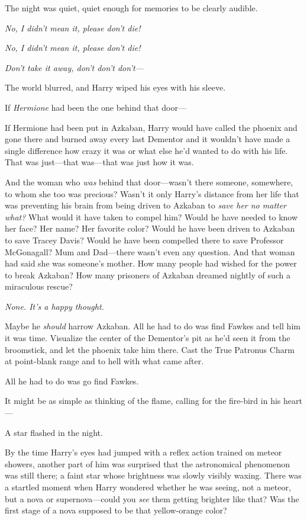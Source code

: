 The night was quiet, quiet enough for memories to be clearly audible.

\emph{No, I didn't mean it, please don't die!}

\emph{No, I didn't mean it, please don't die!}

\emph{Don't take it away, don't don't don't---}

The world blurred, and Harry wiped his eyes with his sleeve.

If \emph{Hermione} had been the one behind that door---

If Hermione had been put in Azkaban, Harry would have called the phoenix and
gone there and burned away every last Dementor and it wouldn't have made a
single difference how crazy it was or what else he'd wanted to do with his
life. That was just---that was---that was just how it was.

And the woman who \emph{was} behind that door---wasn't there someone,
somewhere, to whom she too was precious? Wasn't it only Harry's distance from
her life that was preventing his brain from being driven to Azkaban to
\emph{save her no matter what?} What would it have taken to compel him? Would
he have needed to know her face? Her name? Her favorite color? Would he have
been driven to Azkaban to save Tracey Davis? Would he have been compelled there
to save Professor McGonagall? Mum and Dad---there wasn't even any question. And
that woman had said she was someone's mother. How many people had wished for
the power to break Azkaban? How many prisoners of Azkaban dreamed nightly of
such a miraculous rescue?

\emph{None. It's a happy thought.}

Maybe he \emph{should} harrow Azkaban. All he had to do was find Fawkes and
tell him it was time. Visualize the center of the Dementor's pit as he'd seen
it from the broomstick, and let the phoenix take him there. Cast the True
Patronus Charm at point-blank range and to hell with what came after.

All he had to do was go find Fawkes.

It might be as simple as thinking of the flame, calling for the fire-bird in
his heart---

A star flashed in the night.

By the time Harry's eyes had jumped with a reflex action trained on meteor
showers, another part of him was surprised that the astronomical phenomenon was
still there; a faint star whose brightness was slowly visibly waxing. There was
a startled moment when Harry wondered whether he was seeing, not a meteor, but
a nova or supernova---could you \emph{see} them getting brighter like that? Was
the first stage of a nova supposed to be that yellow-orange color?

